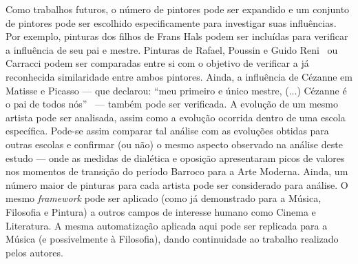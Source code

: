 Como trabalhos futuros, o número de pintores pode ser expandido e um
conjunto de pintores pode ser escolhido especificamente para
investigar suas influências. Por exemplo, pinturas dos filhos de Frans
Hals podem ser incluídas para verificar a influência de seu pai e
mestre. Pinturas de Rafael, Poussin e Guido Reni~\cite{gombrich} ou
Carracci podem ser comparadas entre si com o objetivo de verificar a
já reconhecida similaridade entre ambos pintores. Ainda, a influência
de Cézanne em Matisse e Picasso --- que declarou: ``meu primeiro e
único mestre, (...)  Cézanne é o pai de todos nós''~\cite{rishel} ---
também pode ser verificada. A evolução de um mesmo artista pode ser
analisada, assim como a evolução ocorrida dentro de uma escola
específica. Pode-se assim comparar tal análise com as evoluções
obtidas para outras escolas e confirmar (ou não) o mesmo aspecto
observado na análise deste estudo --- onde as medidas de dialética e
oposição apresentaram picos de valores nos momentos de transição do
período Barroco para a Arte Moderna. Ainda, um número maior de
pinturas para cada artista pode ser considerado para análise. O mesmo
\textit{framework} pode ser aplicado (como já demonstrado para a
Música, Filosofia e Pintura) a outros campos de interesse humano como
Cinema e Literatura. A mesma automatização aplicada aqui pode ser
replicada para a Música (e possivelmente à Filosofia), dando
continuidade ao trabalho realizado pelos autores.~\cite{vieira}


